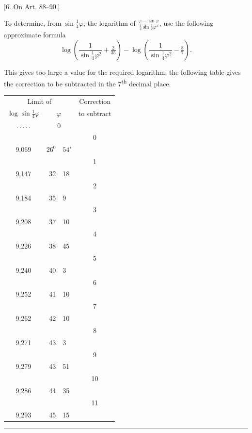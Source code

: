 \begin{center}
[6. On Art. 88–90.]
\end{center}
To determine, from \(\sin\tfrac14\varphi\), the logarithm of \(\frac{\varphi-\sin\varphi}{\tfrac43\sin\tfrac12\varphi^3}\), use the following approximate formula
\[
\log\left(\frac{1}{\sin\tfrac14\varphi^2}+\tfrac{2}{35}\right)-\log\left(\frac{1}{\sin\tfrac14\varphi^2}-\tfrac87\right).
\]

This gives too large a value for the required logarithm: the following table gives the correction to be subtracted in the 7\textsuperscript{th} decimal place.
\begin{center}
\begingroup\renewcommand{\arraystretch}{.7}
\begin{tabular}{c|r@{\ }l|c}
\multicolumn{3}{c|}{Limit of}&Correction\\
\(\log\sin\tfrac14\varphi\)&\multicolumn{2}{c|}{\(\varphi\)}&to subtract\\[1.2pt]
\hline
.\,.\,.\,.\,.&\multicolumn{2}{c|}{\rule{0pt}{9pt}0}&\\
&&&0\\
9,069&\(26^0\)&\(54'\)&\\
&&&1\\
9,147&32&18&\\
&&&2\\
9,184&35&9&\\
&&&3\\
9,208&37&10&\\
&&&4\\
9,226&38&45&\\
&&&5\\
9,240&40&3&\\
&&&6\\
9,252&41&10&\\
&&&7\\
9,262&42&10&\\
&&&8\\
9,271&43&3&\\
&&&9\\
9,279&43&51&\\
&&&10\\
9,286&44&35&\\
&&&11\\
9,293&45&15&
\end{tabular}
\endgroup
\end{center}
\begin{center}\rule{.22\textwidth}{.35pt}\end{center}

